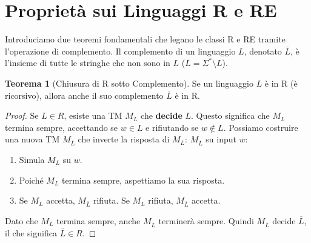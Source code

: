 \documentclass[a4paper]{article}
\theoremstyle{definition} %
\newtheorem{theorem}{Teorema}
\theoremstyle{remark} %
\begin{document}
\section{Proprietà sui Linguaggi R e RE}

Introduciamo due teoremi fondamentali che legano le classi R e RE tramite l'operazione di complemento. Il complemento di un linguaggio $L$, denotato $\overline{L}$, è l'insieme di tutte le stringhe che non sono in $L$ ($\overline{L} = \Sigma^* \setminus L$).

\begin{theorem}[Chiusura di R sotto Complemento]
Se un linguaggio $L$ è in R (è ricorsivo), allora anche il suo complemento $\overline{L}$ è in R.
\end{theorem}
\begin{proof}
Se $L \in R$, esiste una TM $M_L$ che \textbf{decide} $L$. Questo significa che $M_L$ termina sempre, accettando se $w \in L$ e rifiutando se $w \notin L$.
Possiamo costruire una nuova TM $M_{\overline{L}}$ che inverte la risposta di $M_L$:
$M_{\overline{L}}$ su input $w$:
\begin{enumerate}
    \item Simula $M_L$ su $w$.
    \item Poiché $M_L$ termina sempre, aspettiamo la sua risposta.
    \item Se $M_L$ accetta, $M_{\overline{L}}$ rifiuta. Se $M_L$ rifiuta, $M_{\overline{L}}$ accetta.
\end{enumerate}
Dato che $M_L$ termina sempre, anche $M_{\overline{L}}$ terminerà sempre. Quindi $M_{\overline{L}}$ decide $\overline{L}$, il che significa $\overline{L} \in R$.
\end{proof}
\end{document}
